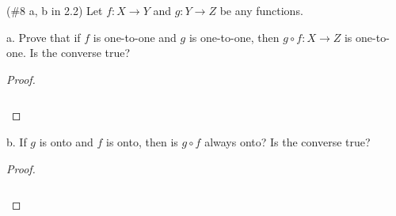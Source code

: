 (\#8 a, b in 2.2) Let $f:X\to Y$ and $g:Y\to Z$ be any functions.

a. Prove that if $f$ is one-to-one and $g$ is one-to-one, then $g\circ f:X\to Z$
 is one-to-one. Is the converse true?


    \begin{proof}\renewcommand{\qedsymbol}{}\ \\\\
        \begin{align*}
        \end{align*}
    \end{proof}

\pagebreak
b. If $g$ is onto and $f$ is onto, then is $g\circ f$ always onto? Is the
   converse true?

    \begin{proof}\renewcommand{\qedsymbol}{}\ \\\\
        \begin{align*}
        \end{align*}
    \end{proof}